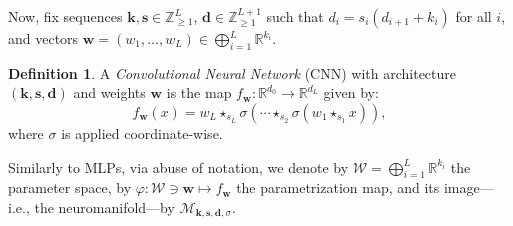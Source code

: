 \documentclass{article} %
\theoremstyle{plain}%
\theoremstyle{definition}
\newtheorem{defn}{Definition}
\theoremstyle{remark}
\newcommand{\conv}[1]{\star_{#1}}
\newcommand{\mfldconv}{\mathcal{M}_{\mathbf{k}, \mathbf{s}, \mathbf{d}, \sigma}}
\begin{document}
Now, fix sequences $\mathbf{k}, \mathbf{s} \in \mathbb{Z}_{\geq 1}^{L}$, $\mathbf{d} \in \mathbb{Z}_{\geq 1}^{L+1}$ such that $d_i = s_i(d_{i+1} + k_i)$ for all $i$, and vectors $\mathbf{w} = (w_1, \ldots, w_L) \in \bigoplus_{i=1}^L\mathbb{R}^{k_i}$. 
\begin{defn}
A \emph{Convolutional Neural Network} (CNN) with architecture $(\mathbf{k}, \mathbf{s}, \mathbf{d})$ and weights $\mathbf{w}$ is the map $f_\mathbf{w} \colon \mathbb{R}^{d_0} \rightarrow \mathbb{R}^{d_L}$ given by:
\begin{equation}
f_\mathbf{w}(x) = w_{L} \conv{s_{L}} \sigma \left(\cdots \conv{s_2}  \sigma ( w_1 \conv{s_1} x   ) \right),
\end{equation}
where $\sigma$ is applied coordinate-wise.
\end{defn}
Similarly to MLPs, via abuse of notation, we denote by $\mathcal{W} = \bigoplus_{i=1}^L\mathbb{R}^{k_i}$ the parameter space, by $\varphi \colon \mathcal{W} \ni \mathbf{w} \mapsto f_\mathbf{w}$ the parametrization map, and its image---i.e., the neuromanifold---by $\mfldconv$. 
\end{document}
